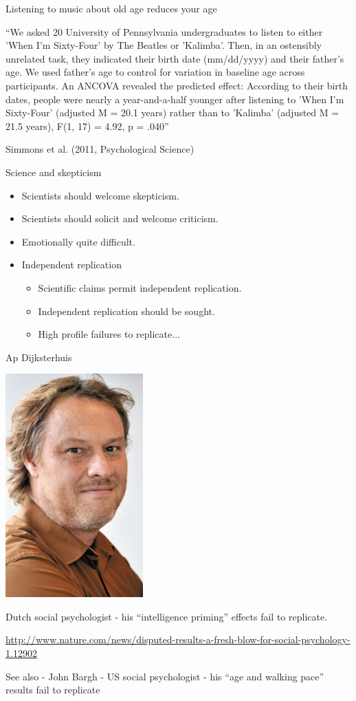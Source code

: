 \documentclass{beamer}
\begin{document}
\begin{frame}{Listening to music about old age reduces your age}
	
	``We asked 20 University of Pennsylvania undergraduates to listen to either 'When I’m Sixty-Four' by The Beatles or 'Kalimba'. Then, in an ostensibly unrelated task, they indicated their birth date (mm/dd/yyyy) and their father’s age. We used father’s age to control for variation in baseline age across participants. An ANCOVA revealed the predicted effect: According to their birth dates, people were nearly a year-and-a-half younger after listening to 'When I’m Sixty-Four' (adjusted M = 20.1 years) rather than to 'Kalimba' (adjusted M = 21.5 years), F(1, 17) = 4.92, p = .040''
	
	\vspace{12 pt}
	
	Simmons et al. (2011, Psychological Science)
	
\end{frame}

\begin{frame}{Science and skepticism}
	\begin{itemize}
		\item Scientists should welcome skepticism.
		\item Scientists should solicit and welcome criticism.
		\item Emotionally quite difficult.
		\item Independent replication
		\begin{itemize}
			\item Scientific claims permit independent replication.
			\item Independent replication should be sought.
			\item High profile failures to replicate...
		\end{itemize}
	\end{itemize}
\end{frame}

\begin{frame}{Ap Dijksterhuis}
	\centerline{\includegraphics[width=.3\textwidth]{pics/ap.jpg}}

	Dutch social psychologist - his ``intelligence priming'' effects fail to replicate. 
	
	\url{http://www.nature.com/news/disputed-results-a-fresh-blow-for-social-psychology-1.12902}
	
	See also - John Bargh - US social psychologist - his ``age and walking pace'' results fail to replicate
	
\end{frame}
\end{document}
